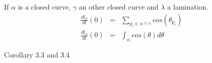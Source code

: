 \begin{lem}
If $\alpha$ is a closed curve, $\gamma$ an other closed curve and $\lambda$ a lamination.\[
\begin{array}{crcl}

\frac{dl_{\alpha}}{dt}(0) & = & \sum_{p_i \in \alpha \cap \gamma} cos(\theta_{p_i}) \\

\frac{dl_{\alpha}}{dt}(0) & = & \int_{ \alpha} cos(\theta) d \theta

\end{array}
\]
\end{lem}
\cite{NielsenRealizationPro} Corollary 3.3 and 3.4
